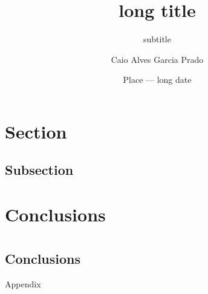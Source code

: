 \documentclass[aspectratio=43,hyperref={hidelinks,breaklinks,unicode}]{beamer}
\title[short title]{long title}
\subtitle{subtitle}
\author[Caio Prado]{Caio Alves Garcia Prado}
\institute{Institute or Conference Name}
\date[xx/xx/xx]{Place --- long date}
\begin{document}
\logoframe
\titleframe
\tocframe
{}

\section{Section}
\subsection{Subsection}
\begin{frame}[fragile]
    \fontsample[0.6]
\end{frame}

\section{Conclusions}
\section*{ }\subsection*{Conclusions}
\begin{frame}[fragile]
\end{frame}

\appendix
\begin{frame}[fragile]
    Appendix
\end{frame}
\end{document}
